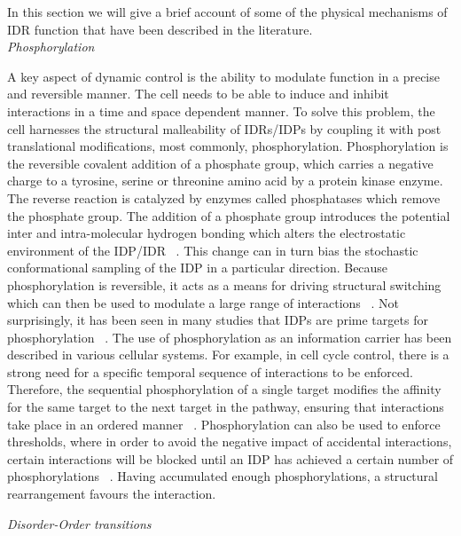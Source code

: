 In this section we will give a brief account of some of the physical mechanisms of IDR function that have been described in the literature. \\

{\it Phosphorylation}

A key aspect of dynamic control is the ability to modulate function in a precise and reversible manner.  The cell needs to be able to induce and inhibit interactions in a time and space dependent manner. To solve this problem, the cell harnesses the structural malleability of IDRs/IDPs by coupling it with post translational modifications, most commonly, phosphorylation. Phosphorylation is the reversible covalent addition of a phosphate  group,  which carries a negative  charge to a tyrosine, serine or threonine  amino acid by a protein kinase enzyme. The reverse reaction is catalyzed by enzymes called phosphatases which remove the phosphate group. The addition of a phosphate group introduces the potential inter and intra-molecular hydrogen bonding which alters the electrostatic environment of the IDP/IDR ~\cite{van1990effect}. This change can in turn bias the stochastic conformational sampling of the IDP in a particular direction. Because phosphorylation is reversible, it acts as a means for driving structural switching which can then be used to modulate a large range of interactions ~\cite{kern1999structure, ramelot2001phosphorylation, oxley2008integrin}. Not surprisingly, it has been seen in many studies that IDPs are prime targets for phosphorylation ~\cite{iakoucheva2004importance}.  The use of phosphorylation as an information carrier has been described in various cellular systems. For example, in cell cycle control, there is a strong need for a specific temporal sequence of interactions to be enforced. Therefore, the sequential phosphorylation of a single target modifies the affinity for the same target to the next target in the pathway, ensuring that interactions take place in an ordered manner ~\cite{wright2015intrinsically}. Phosphorylation can also be used to enforce thresholds, where in order to avoid the negative impact of accidental interactions, certain interactions will be blocked until an IDP has achieved a certain number of phosphorylations ~\cite{nash2001multisite}. Having accumulated enough phosphorylations, a structural rearrangement favours the interaction. 

{\it Disorder-Order transitions}

